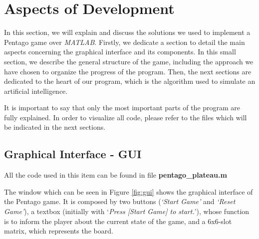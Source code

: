 \section{Aspects of Development}

In this section, we will explain and discuss the solutions we used to implement
a Pentago game over \textit{MATLAB}.  Firstly, we dedicate a section to detail
the main aspects concerning the graphical interface and its components. In this
small section, we describe the general structure of the game, including the
approach we have chosen to organize the progress of the program. Then, the next
sections are dedicated to the heart of our program, which is the algorithm used
to simulate an artificial intelligence.

\vspace{10pt}

It is important to say that only the most important parts of the program are
fully explained. In order to visualize all code, please refer to the files
which will be indicated in the next sections.

\subsection{Graphical Interface - GUI}

All the code used in this item can be found in file \textbf{pentago\_plateau.m}

\vspace{10pt}

The window which can be seen in Figure \ref{fig:gui} shows the graphical
interface of the Pentago game. It is composed by two buttons  (\textit{‘Start
Game’} and \textit{‘Reset Game’}), a textbox (initially with ‘\textit{Press
[Start Game] to start.}’), whose function is to inform the player about the
current state of the game,  and a 6x6-slot matrix, which represents the board.

